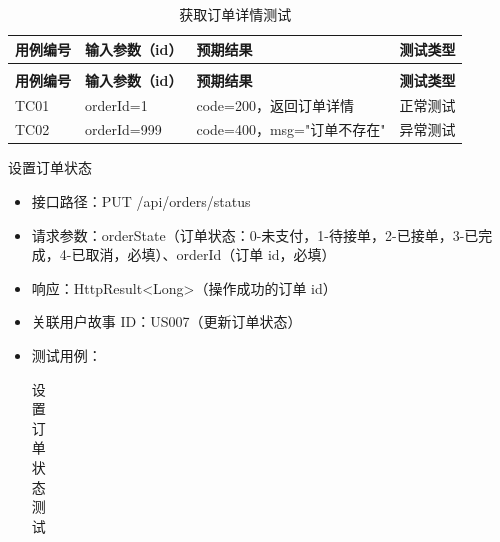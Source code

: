 \begin{levellist}
\begin{levellist}
\begin{itemize}
\begin{longtable}{>{\centering\arraybackslash}m{1.7cm} >{\centering\arraybackslash}m{3cm} >{\centering\arraybackslash}m{6.3cm} >{\centering\arraybackslash}m{2cm}}
                      \caption{获取订单详情测试} \label{tab:training}                                  \\

                      \toprule
                      \textbf{用例编号} & \textbf{输入参数（id）} & \textbf{预期结果}        & \textbf{测试类型} \\
                      \midrule
                      \endfirsthead

                      \multicolumn{4}{c}{{\tablename\ \thetable{} 续表}}                         \\
                      \toprule
                      \textbf{用例编号} & \textbf{输入参数（id）} & \textbf{预期结果}        & \textbf{测试类型} \\
                      \midrule
                      \endhead

                      \bottomrule
                      \endfoot

                      TC01          & orderId=1         & code=200，返回订单详情      & 正常测试          \\
                      TC02          & orderId=999       & code=400，msg="订单不存在" & 异常测试          \\
                  \end{longtable}
        \end{itemize}

        \item 设置订单状态
        \begin{itemize}
            \item 接口路径：PUT /api/orders/status
            \item 请求参数：orderState（订单状态：0-未支付，1-待接单，2-已接单，3-已完成，4-已取消，必填）、orderId（订单 id，必填）
            \item 响应：HttpResult<Long>（操作成功的订单 id）
            \item 关联用户故事 ID：US007（更新订单状态）
            \item 测试用例：
                  \begin{longtable}{>{\centering\arraybackslash}m{1.7cm} >{\centering\arraybackslash}m{3cm} >{\centering\arraybackslash}m{6.3cm} >{\centering\arraybackslash}m{2cm}}

                      \caption{设置订单状态测试} \label{tab:training}                                  \\


\end{longtable}
\end{itemize}
\end{levellist}
\end{levellist}
